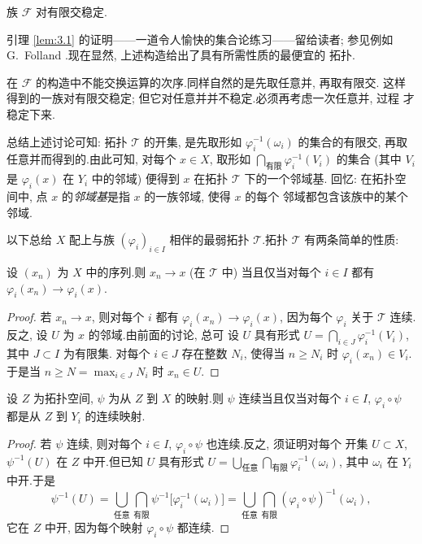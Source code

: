 \begin{lemma}
\label{lem:3.1}
族 $\mathcal{F}$ 对有限交稳定.
\end{lemma}

引理  \ref{lem:3.1} 的证明——一道令人愉快的集合论练习——留给读者; 参见例如
G.~Folland .现在显然, 上述构造给出了具有所需性质的最便宜的
拓扑.

\begin{remark}
\label{rem:3.1}
在 $\mathcal{F}$ 的构造中不能交换运算的次序.同样自然的是先取任意并, 再取有限交.
这样得到的一族对有限交稳定; 但它对任意并并不稳定.必须再考虑一次任意并, 过程
才稳定下来.
\end{remark}

总结上述讨论可知: 拓扑 $\mathcal{T}$ 的开集, 是先取形如
$\varphi_i^{-1}(\omega_i)$ 的集合的有限交, 再取任意并而得到的.由此可知, 对每个
$x\in X$, 取形如 $\bigcap_{\text{有限}}\varphi_i^{-1}(V_i)$ 的集合 (其中 $V_i$ 是
$\varphi_i(x)$ 在 $Y_i$ 中的邻域) 便得到 $x$ 在拓扑 $\mathcal{T}$ 下的一个邻域基.
回忆: 在拓扑空间中, 点 $x$ 的\emph{邻域基}是指 $x$ 的一族邻域, 使得 $x$ 的每个
邻域都包含该族中的某个邻域.

以下总给 $X$ 配上与族 $(\varphi_i)_{i\in I}$ 相伴的最弱拓扑 $\mathcal{T}$.拓扑
$\mathcal{T}$ 有两条简单的性质:

\begin{keyproposition}
\label{prop:3.1}
设 $(x_n)$ 为 $X$ 中的序列.则 $x_n\to x$ (在 $\mathcal{T}$ 中) 当且仅当对每个
$i\in I$ 都有 $\varphi_i(x_n)\to\varphi_i(x)$.
\end{keyproposition}

\begin{proof}
若 $x_n\to x$, 则对每个 $i$ 都有 $\varphi_i(x_n)\to\varphi_i(x)$, 因为每个
$\varphi_i$ 关于 $\mathcal{T}$ 连续.反之, 设 $U$ 为 $x$ 的邻域.由前面的讨论, 总可
设 $U$ 具有形式 $U=\bigcap_{i\in J}\varphi_i^{-1}(V_i)$, 其中 $J\subset I$ 为有限集.
对每个 $i\in J$ 存在整数 $N_i$, 使得当 $n\ge N_i$ 时 $\varphi_i(x_n)\in V_i$.
于是当 $n\ge N=\max_{i\in J}N_i$ 时 $x_n\in U$.
\end{proof}

\begin{keyproposition}
\label{prop:3.2}
设 $Z$ 为拓扑空间, $\psi$ 为从 $Z$ 到 $X$ 的映射.则 $\psi$ 连续当且仅当对每个
$i\in I$, $\varphi_i\circ\psi$ 都是从 $Z$ 到 $Y_i$ 的连续映射.
\end{keyproposition}

\begin{proof}
若 $\psi$ 连续, 则对每个 $i\in I$, $\varphi_i\circ\psi$ 也连续.反之, 须证明对每个
开集 $U\subset X$, $\psi^{-1}(U)$ 在 $Z$ 中开.但已知 $U$ 具有形式
$U=\bigcup_{\text{任意}}\bigcap_{\text{有限}}\varphi_i^{-1}(\omega_i)$, 其中
$\omega_i$ 在 $Y_i$ 中开.于是
\begin{equation*}
\psi^{-1}(U)
=\bigcup_{\text{任意}}\bigcap_{\text{有限}}\psi^{-1}\bigl[\varphi_i^{-1}(\omega_i)\bigr]
=\bigcup_{\text{任意}}\bigcap_{\text{有限}}(\varphi_i\circ\psi)^{-1}(\omega_i),
\end{equation*}
它在 $Z$ 中开, 因为每个映射 $\varphi_i\circ\psi$ 都连续.
\end{proof}

